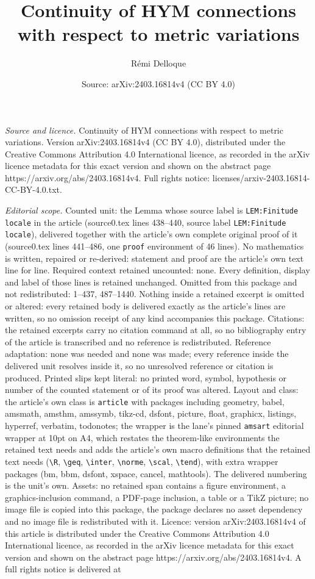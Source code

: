 \documentclass[10pt,a4paper]{amsart}
\title[Continuity of HYM connections with respect to metric variati]{Continuity of HYM connections with respect to metric variations}
\author{R\'emi Delloque}
\date{Source: arXiv:2403.16814v4 (CC BY 4.0)}
\begin{document}
\maketitle

\noindent\emph{Source and licence.} Continuity of HYM connections with respect to metric variations. Version arXiv:2403.16814v4 (CC BY 4.0), distributed under the Creative Commons Attribution 4.0 International licence, as recorded in the arXiv licence metadata for this exact version and shown on the abstract page https://arxiv.org/abs/2403.16814v4. Full rights notice: licenses/arxiv-2403.16814-CC-BY-4.0.txt.\par\smallskip

\noindent\textit{Editorial scope.} Counted unit: the Lemma whose source label is \texttt{LEM:Finitude locale} in the article (source0.tex lines 438--440, source label \texttt{LEM:Finitude locale}), delivered together with the article's own complete original proof of it (source0.tex lines 441--486, one \texttt{proof} environment of 46 lines). No mathematics is written, repaired or re-derived: statement and proof are the article's own text line for line. Required context retained uncounted: none. Every definition, display and label of those lines is retained unchanged. Omitted from this package and not redistributed: 1--437, 487--1440. Nothing inside a retained excerpt is omitted or altered: every retained body is delivered exactly as the article's lines are written, so no omission receipt of any kind accompanies this package. Citations: the retained excerpts carry no citation command at all, so no bibliography entry of the article is transcribed and no reference is redistributed. Reference adaptation: none was needed and none was made; every reference inside the delivered unit resolves inside it, so no unresolved reference or citation is produced. Printed slips kept literal: no printed word, symbol, hypothesis or number of the counted statement or of its proof was altered. Layout and class: the article's own class is \texttt{article} with packages including geometry, babel, amsmath, amsthm, amssymb, tikz-cd, dsfont, picture, float, graphicx, listings, hyperref, verbatim, todonotes; the wrapper is the lane's pinned \texttt{amsart} editorial wrapper at 10pt on A4, which restates the theorem-like environments the retained text needs and adds the article's own macro definitions that the retained text needs (\texttt{\textbackslash R}, \texttt{\textbackslash geq}, \texttt{\textbackslash inter}, \texttt{\textbackslash norme}, \texttt{\textbackslash scal}, \texttt{\textbackslash tend}), with extra wrapper packages (bm, bbm, dsfont, xspace, cancel, mathtools). The delivered numbering is the unit's own. Assets: no retained span contains a figure environment, a graphics-inclusion command, a PDF-page inclusion, a table or a TikZ picture; no image file is copied into this package, the package declares no asset dependency and no image file is redistributed with it. Licence: version arXiv:2403.16814v4 of this article is distributed under the Creative Commons Attribution 4.0 International licence, as recorded in the arXiv licence metadata for this exact version and shown on the abstract page https://arxiv.org/abs/2403.16814v4. A full rights notice is delivered at 
\end{document}
